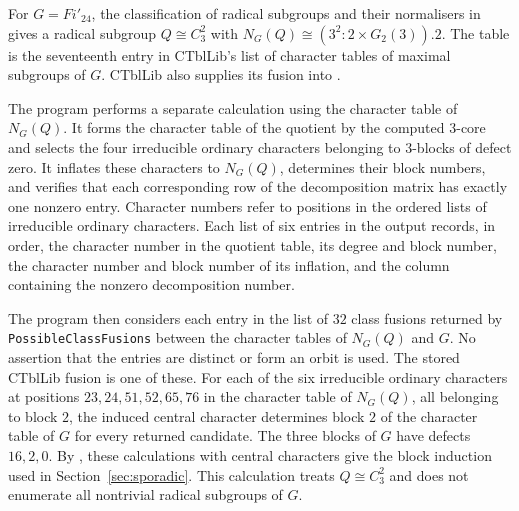\documentclass[10pt]{amsart}
\theoremstyle{definition}
\numberwithin{equation}{section}
\numberwithin{table}{section}
\begin{document}
For $G=Fi'_{24}$, the classification of radical subgroups and their
normalisers in \cite[Proposition~4.1 and Table~1]{AnCannonOBrienUngerFi24}
gives a radical subgroup $Q\cong C_3^2$ with
$N_G(Q)\cong(3^2\!:\!2\times G_2(3)).2$.
The table  is the seventeenth entry in CTblLib's
list of character tables of maximal subgroups of $G$. CTblLib also
supplies its fusion into .

The program  performs a separate calculation using the
character table of $N_G(Q)$. It forms the character table of the quotient by
the computed $3$-core and selects the four irreducible ordinary characters
belonging to $3$-blocks of defect zero. It inflates these characters to
$N_G(Q)$, determines their block numbers, and verifies that each corresponding
row of the decomposition matrix has exactly one nonzero entry. Character
numbers refer to positions in the ordered lists of irreducible ordinary
characters. Each list of six entries in the output records, in order, the
character number in the quotient table, its degree and block number, the
character number and block number of its inflation, and the column containing
the nonzero decomposition number.

The program  then considers each entry in the list of
$32$ class fusions returned by \texttt{PossibleClassFusions} between the
character tables of $N_G(Q)$ and $G$. No assertion that the entries are
distinct or form an orbit is used.  The stored CTblLib fusion is
one of these.  For each of the six irreducible ordinary characters at positions
$23,24,51,52,65,76$ in the character table of $N_G(Q)$, all belonging to block
$2$, the induced central character determines block $2$ of the character table
of $G$ for every returned candidate. The three
blocks of $G$ have
defects $16,2,0$.  By
\cite[Theorem~4.14 and Lemma~6.1]{Navarro1998}, these calculations with central characters give the block induction used in Section~\ref{sec:sporadic}.
This calculation treats $Q\cong C_3^2$ and does not enumerate all
nontrivial radical subgroups of $G$.
\end{document}
